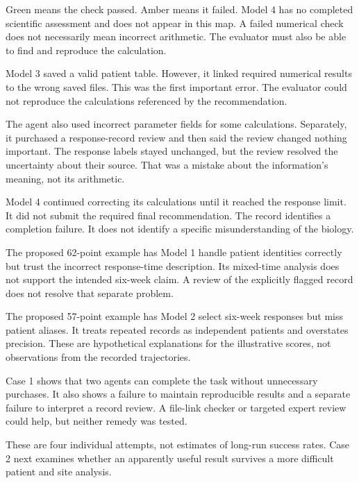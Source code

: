 Green means the check passed. Amber means it failed. Model 4 has no completed scientific assessment and does not appear in this map. A failed numerical check does not necessarily mean incorrect arithmetic. The evaluator must also be able to find and reproduce the calculation.

Model 3 saved a valid patient table. However, it linked required numerical results to the wrong saved files. This was the first important error. The evaluator could not reproduce the calculations referenced by the recommendation.

\begin{center}
\end{center}

The agent also used incorrect parameter fields for some calculations. Separately, it purchased a response-record review and then said the review changed nothing important. The response labels stayed unchanged, but the review resolved the uncertainty about their source. That was a mistake about the information's meaning, not its arithmetic.

Model 4 continued correcting its calculations until it reached the response limit. It did not submit the required final recommendation. The record identifies a completion failure. It does not identify a specific misunderstanding of the biology.

The proposed 62-point example has Model 1 handle patient identities correctly but trust the incorrect response-time description. Its mixed-time analysis does not support the intended six-week claim. A review of the explicitly flagged record does not resolve that separate problem.

The proposed 57-point example has Model 2 select six-week responses but miss patient aliases. It treats repeated records as independent patients and overstates precision. These are hypothetical explanations for the illustrative scores, not observations from the recorded trajectories.

Case 1 shows that two agents can complete the task without unnecessary purchases. It also shows a failure to maintain reproducible results and a separate failure to interpret a record review. A file-link checker or targeted expert review could help, but neither remedy was tested.

These are four individual attempts, not estimates of long-run success rates. Case 2 next examines whether an apparently useful result survives a more difficult patient and site analysis.
